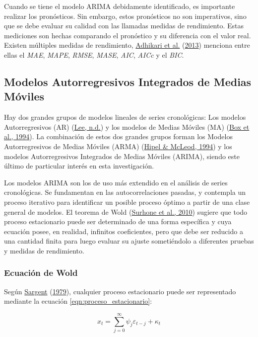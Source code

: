\documentclass[
]{article}
\begin{document}
Cuando se tiene el modelo ARIMA debidamente identificado, es importante
realizar los pronósticos. Sin embargo, estos pronósticos no son
imperativos, sino que se debe evaluar su calidad con las llamadas
medidas de rendimiento. Estas mediciones son hechas comparando el
pronóstico y su diferencia con el valor real. Existen múltiples medidas
de rendimiento, \protect\hyperlink{ref-medidas}{Adhikari et al.}
(\protect\hyperlink{ref-medidas}{2013}) menciona entre ellas el
\emph{MAE}, \emph{MAPE}, \emph{RMSE}, \emph{MASE}, \emph{AIC},
\emph{AICc} y el \emph{BIC}.

\subsection{Modelos Autorregresivos Integrados de Medias Móviles}

Hay dos grandes grupos de modelos lineales de series cronológicas: Los
modelos Autorregresivos (AR) (\protect\hyperlink{ref-Lee}{Lee, n.d.}) y
los modelos de Medias Móviles (MA)
(\protect\hyperlink{ref-box-jenkins}{Box et al., 1994}). La combinación
de estos dos grandes grupos forman los Modelos Autorregresivos de Medias
Móviles (ARMA) (\protect\hyperlink{ref-Hipel}{Hipel \& McLeod, 1994}) y
los modelos Autorregresivos Integrados de Medias Móviles (ARIMA), siendo
este último de particular interés en esta investigación.

Los modelos ARIMA son los de uso más extendido en el análisis de series
cronológicas. Se fundamentan en las autocorrelaciones pasadas, y
contempla un proceso iterativo para identificar un posible proceso
óptimo a partir de una clase general de modelos. El teorema de Wold
(\protect\hyperlink{ref-Wold}{Surhone et al., 2010}) sugiere que todo
proceso estacionario puede ser determinado de una forma específica y
cuya ecuación posee, en realidad, infinitos coeficientes, pero que debe
ser reducido a una cantidad finita para luego evaluar su ajuste
sometiéndolo a diferentes pruebas y medidas de rendimiento.

\subsubsection{Ecuación de Wold}

Según \protect\hyperlink{ref-sargent_macro}{Sargent}
(\protect\hyperlink{ref-sargent_macro}{1979}), cualquier proceso
estacionario puede ser representado mediante la ecuación
\ref{eqn:proceso_estacionario}:

\begin{equation}
\label{eqn:proceso_estacionario}
x_t=\sum_{j=0}^{\infty} \psi_j\varepsilon_{t-j}+\kappa_t
\end{equation}
\end{document}
